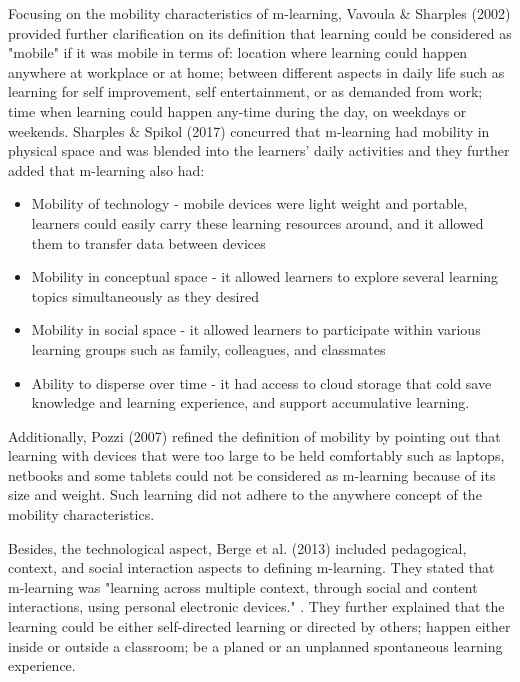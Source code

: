 Focusing on the mobility characteristics of m-learning, Vavoula \& Sharples (2002) \cite{vavoula2002kleos} provided further clarification on its definition that learning could be considered as "mobile" if it was mobile in terms of: location where learning could happen anywhere at workplace or at home; between different aspects in daily life such as learning for self improvement, self entertainment, or as demanded from work; time when learning could happen any-time during the day, on weekdays or weekends. Sharples \& Spikol (2017) \cite{sharples2017mobile} concurred that m-learning had mobility in physical space and was blended into the learners' daily activities and they further added that m-learning also had: 
\begin{itemize} 
\item Mobility of technology - mobile devices were light weight and portable, learners could easily carry these learning resources around, and it allowed them to transfer data between devices
\item Mobility in conceptual space - it allowed learners to explore several learning topics simultaneously as they desired
\item Mobility in social space - it allowed learners to participate within various learning groups such as family, colleagues, and classmates
\item Ability to disperse over time - it had access to cloud storage that cold save knowledge and learning experience, and support accumulative learning. 
\end{itemize} 

Additionally, Pozzi (2007) \cite{pozzi2007impact} refined the definition of mobility by pointing out that learning with devices that were too large to be held comfortably such as laptops, netbooks and some tablets could not be considered as m-learning because of its size and weight. Such learning did not adhere to the anywhere concept of the mobility characteristics. 

Besides, the technological aspect, Berge et al. (2013) \cite{berge2013handbook} included pedagogical, context, and social interaction aspects to defining m-learning. They stated that m-learning was "learning across multiple context, through social and content interactions, using personal electronic devices." \cite[pp. 4]{berge2013handbook}. They further explained that the learning could be either self-directed learning or directed by others; happen either inside or outside a classroom; be a planed or an unplanned spontaneous learning experience. 


